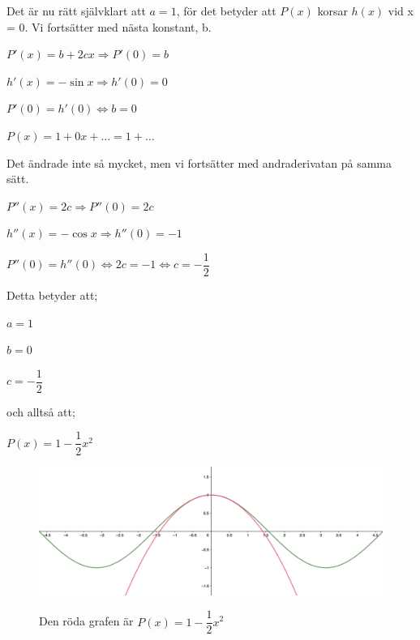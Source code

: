 \documentclass[10pt, a4paper]{amsart}
\begin{document}
Det är nu rätt självklart att $ a = 1 $, för det betyder att $ P(x) $ korsar $ h(x) $ vid x = 0. 
Vi fortsätter med nästa konstant, b.
\vspace{24pt plus 4pt minus 4pt}

\hspace{5ex}
$ P'(x) = b + 2cx \Rightarrow P'(0) = b $

\hspace{5ex}
$ h'(x) = -\sin x \Rightarrow h'(0) = 0 $
\bigskip

\hspace{5ex}
$ P'(0) = h'(0) \iff b = 0 $
\bigskip

\hspace{5ex}
$ P(x) = 1 + 0x + \dotso = 1 + \dotso $
\vspace{24pt plus 4pt minus 4pt}

Det ändrade inte så mycket, men vi fortsätter med andraderivatan på samma sätt.
\vspace{24pt plus 4pt minus 4pt}

\hspace{5ex}
$ P''(x) = 2c \Rightarrow P''(0) = 2c $

\hspace{5ex}
$ h''(x) = -\cos x \Rightarrow h''(0) = -1 $
\bigskip

\hspace{5ex}
$ P''(0) = h''(0) \iff 2c = -1 \iff c = -\dfrac{1}{2} $
\vspace{24pt plus 4pt minus 4pt}

Detta betyder att;
\vspace{24pt plus 4pt minus 4pt}

\hspace{5ex}
$ a = 1 $

\hspace{5ex}
$ b = 0 $

\hspace{5ex}
$ c = -\dfrac{1}{2} $
\vspace{24pt plus 4pt minus 4pt}

och alltså att;
\vspace{24pt plus 4pt minus 4pt}

\hspace{5ex}
$ P(x) = 1 - \dfrac{1}{2}x^2 $
\bigskip
\bigskip

\begin{figure}[ht!]
    \includegraphics[width=\linewidth]{photos/chapter1/3.png}
    \centerline{Den röda grafen är $ P(x) = 1 - \dfrac{1}{2}x^2 $}
\end{figure}
\bigskip
\end{document}
